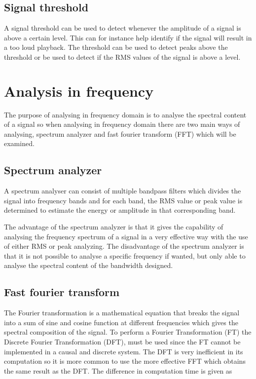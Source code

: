 \subsection*{Signal threshold}
A signal threshold can be used to detect whenever the amplitude of a signal is above a certain level. This can for instance help identify if the signal will result in a too loud playback. The threshold can be used to detect peaks above the threshold or be used to detect if the RMS values of the signal is above a level.

\section{Analysis in frequency} \label{sec:SignalFreq}
The purpose of analysing in frequency domain is to analyse the spectral content of a signal so when analysing in frequency domain there are two main ways of analysing, spectrum analyzer and fast fourier transform (FFT) which will be examined.

\subsection*{Spectrum analyzer}
A spectrum analyser can consist of multiple bandpass filters which divides the signal into frequency bands and for each band, the RMS value or peak value is determined to estimate the energy or amplitude in that corresponding band. %

The advantage of the spectrum analyzer is that it gives the capability of analysing the frequency spectrum of a signal in a very effective way with the use of either RMS or peak analyzing. The disadvantage of the spectrum analyzer is that it is not possible to analyse a specific frequency if wanted, but only able to analyse the spectral content of the bandwidth designed.      

\subsection*{Fast fourier transform}
The Fourier transformation is a mathematical equation that breaks the signal into a sum of sine and cosine function at different frequencies which gives the spectral composition of the signal. To perform a Fourier Transformation (FT) the Discrete Fourier Transformation (DFT), must be used since the FT cannot be implemented in a causal and discrete system. The DFT is very inefficient in its computation so it is more common to use the more effective FFT which obtains the same result as the DFT. The difference in computation time is given as


